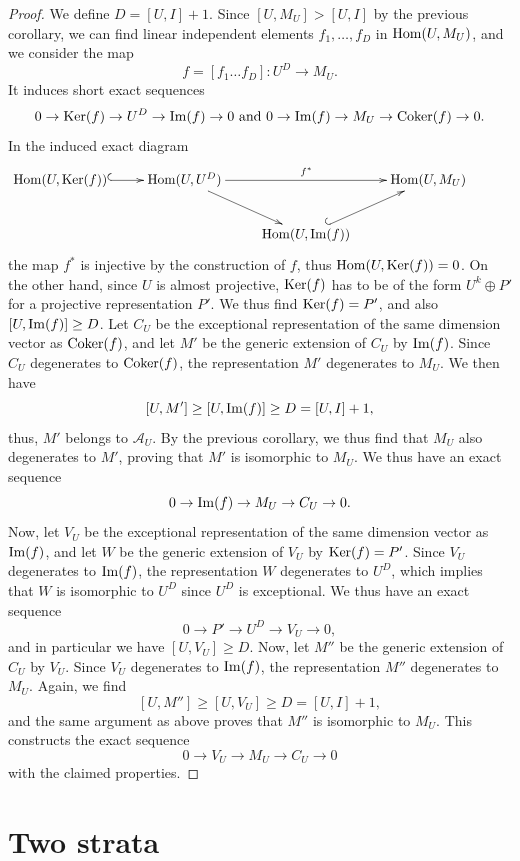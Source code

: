 \documentclass{amsart}
\numberwithin{equation}{section}
\theoremstyle{remark}
\begin{document}
\begin{proof} We define $D=[U,I]+1$. Since $[U,M_U]>[U,I]$ by the previous corollary, we can find linear independent elements $f_1,\ldots,f_D$ in ${\rm Hom}(U,M_U)$, and we consider the map $$f=[f_1\ldots f_D]:U^D\rightarrow M_U.$$
It induces short exact sequences
\[
0\rightarrow{\rm Ker}(f)\rightarrow U^D\rightarrow {\rm Im}(f)\rightarrow 0\mbox{ and }0\rightarrow {\rm Im}(f)\rightarrow M_U\rightarrow{\rm Coker}(f)\rightarrow 0.
\]
In the induced exact diagram
\[
\xymatrix{
{\rm Hom}(U,{\rm Ker}(f))\ar@{^{(}->}[r]&{\rm Hom}(U,U^D)\ar^{f^*}[rr]\ar[dr]&&{\rm Hom}(U,M_U)\\ 
&&{\rm Hom}(U,{\rm Im}(f))\ar@{^(->}[ur]&&
}
\]
the map $f^*$ is injective by the construction of $f$, thus ${\rm Hom}(U,{\rm Ker}(f))=0$. On the other hand, since $U$ is almost projective, ${\rm Ker}(f)$ has to be of the form $U^k\oplus P'$ for a projective representation $P'$. We thus find ${\rm Ker}(f)=P'$, and also $[U,{\rm Im}(f)]\geq D$. Let $C_U$ be the exceptional representation of the same dimension vector as ${\rm Coker}(f)$, and let $M'$ be the generic extension of $C_U$ by ${\rm Im}(f)$. Since $C_U$ degenerates to ${\rm Coker}(f)$, the representation $M'$ degenerates to $M_U$. We then have
$$[U,M']\geq [U,{\rm Im}(f)]\geq D=[U,I]+1,$$
thus, $M'$ belongs to $\mathcal{A}_U$. By the previous corollary, we thus find that $M_U$ also degenerates to $M'$, proving that $M'$ is isomorphic to $M_U$. We thus have an exact sequence
$$0\rightarrow{\rm Im}(f)\rightarrow M_U\rightarrow C_U\rightarrow 0.$$
Now, let $V_U$ be the exceptional representation of the same dimension vector as ${\rm Im}(f)$, and let $W$ be the generic extension of $V_U$ by ${\rm Ker}(f)=P'$. Since $V_U$ degenerates to ${\rm Im}(f)$, the representation $W$ degenerates to $U^D$, which implies that $W$ is isomorphic to $U^D$ since $U^D$ is exceptional. We thus have an exact sequence
$$0\rightarrow P'\rightarrow U^D\rightarrow V_U\rightarrow 0,$$
and in particular we have $[U,V_U]\geq D$. Now, let $M''$ be the generic extension of $C_U$ by $V_U$. Since $V_U$ degenerates to ${\rm Im}(f)$, the representation $M''$ degenerates to $M_U$. Again, we find
$$[U,M'']\geq [U,V_U]\geq D=[U,I]+1,$$
and the same argument as above proves that $M''$ is isomorphic to $M_U$. This constructs the exact sequence
$$0\rightarrow V_U\rightarrow M_U\rightarrow C_U\rightarrow 0$$
with the claimed properties.
\end{proof}


\section{Two strata}\label{sec:twostrata}
\end{document}
